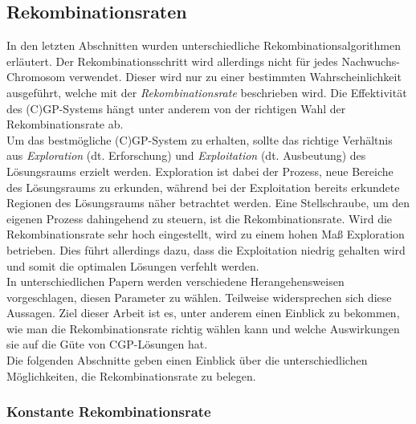 \subsection{Rekombinationsraten}

In den letzten Abschnitten wurden unterschiedliche Rekombinationsalgorithmen erläutert.
Der Rekombinationsschritt wird allerdings nicht für jedes Nachwuchs-Chromosom verwendet.
Dieser wird nur zu einer bestimmten Wahrscheinlichkeit ausgeführt, welche mit der \emph{Rekombinationsrate} beschrieben wird.
Die Effektivität des (C)GP-Systems hängt unter anderem von der richtigen Wahl der Rekombinationsrate ab. \cite{hassanat_choosing_2019}\\
Um das bestmögliche (C)GP-System zu erhalten, sollte das richtige Verhältnis aus \emph{Exploration} (dt. Erforschung) und \emph{Exploitation} (dt. Ausbeutung) des Lösungsraums erzielt werden. 
Exploration ist dabei der Prozess, neue Bereiche des Lösungsraums zu erkunden, während bei der Exploitation bereits erkundete Regionen des Lösungsraums näher betrachtet werden.
Eine Stellschraube, um den eigenen Prozess dahingehend zu steuern, ist die Rekombinationsrate. \cite{crepinsek_exploration_2013}
Wird die Rekombinationsrate sehr hoch eingestellt, wird zu einem hohen Maß Exploration betrieben. 
Dies führt allerdings dazu, dass die Exploitation niedrig gehalten wird und somit die optimalen Lösungen verfehlt werden. \cite{pavai_survey_2017}\\
In unterschiedlichen Papern werden verschiedene Herangehensweisen vorgeschlagen, diesen Parameter zu wählen.
Teilweise widersprechen sich diese Aussagen.
Ziel dieser Arbeit ist es, unter anderem einen Einblick zu bekommen, wie man die Rekombinationsrate richtig wählen kann und welche Auswirkungen sie auf die Güte von CGP-Lösungen hat.\\

Die folgenden Abschnitte geben einen Einblick über die unterschiedlichen Möglichkeiten, die Rekombinationsrate zu belegen.

\subsubsection{Konstante Rekombinationsrate}
\label{subsubsec:konstanteCrossover}

